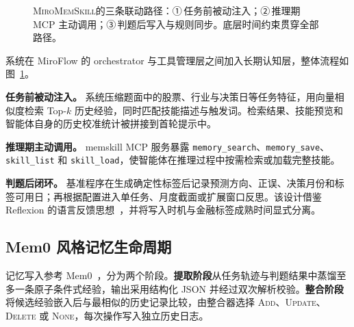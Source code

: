 \documentclass[11pt]{article}
\newcommand{\system}{\textsc{MiroMemSkill}}
\begin{document}
\begin{figure}[t]
{%
}
\caption{\system 的三条联动路径：①\,任务前被动注入；②\,推理期 MCP 主动调用；③\,判题后写入与规则同步。底层时间约束贯穿全部路径。}
\label{fig:architecture}
\end{figure}

系统在 MiroFlow 的 orchestrator 与工具管理层之间加入长期认知层，整体流程如图~\ref{fig:architecture}。

\textbf{任务前被动注入。} 系统压缩题面中的股票、行业与决策日等任务特征，用向量相似度检索 Top-$k$ 历史经验，同时匹配技能描述与触发词。检索结果、技能预览和智能体自身的历史校准统计被拼接到首轮提示中。

\textbf{推理期主动调用。} memskill MCP 服务暴露
\texttt{memory\_search}、\texttt{memory\_save}、\texttt{skill\_list} 和
\texttt{skill\_load}，使智能体在推理过程中按需检索或加载完整技能。

\textbf{判题后闭环。} 基准程序在生成确定性标签后记录预测方向、正误、决策月份和标签可用日；再根据配置进入单任务、月度截面或扩展窗口反思。该设计借鉴 Reflexion 的语言反馈思想~\citep{shinn2023reflexion}，并将写入时机与金融标签成熟时间显式分离。

\subsection{Mem0 风格记忆生命周期}

记忆写入参考 Mem0~\citep{mem0}，分为两个阶段。\textbf{提取阶段}从任务轨迹与判题结果中蒸馏至多一条原子条件式经验，输出采用结构化 JSON 并经过双次解析校验。\textbf{整合阶段}将候选经验嵌入后与最相似的历史记录比较，由整合器选择
\textsc{Add}、\textsc{Update}、\textsc{Delete} 或 \textsc{None}，每次操作写入独立历史日志。
\end{document}
